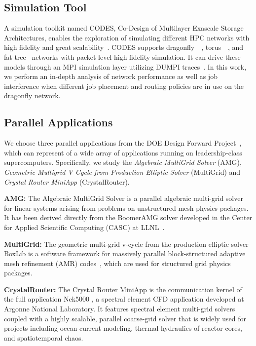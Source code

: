 \documentclass[conference,compsoc]{IEEEtran}
\begin{document}
\subsection{Simulation Tool}
\label{sec:simulation-tool}

A simulation toolkit named CODES, Co-Design of Multilayer Exascale Storage Architectures, enables the exploration of simulating different HPC networks with high fidelity and great scalability~\cite{codes}. CODES supports dragonfly~\cite{codes-dragonfly}~\cite{misbah-tpds}, torus~\cite{misbah-pads-2014}~\cite{ning-pads-2011}, and fat-tree~\cite{ning-pads-2015} networks with packet-level high-fidelity simulation. It can drive these models through an MPI simulation layer utilizing DUMPI traces~\cite{sst}. In this work, we perform an in-depth analysis of network performance as well as job interference when different job placement and routing policies are in use on the dragonfly network.

\subsection{Parallel Applications}
\label{sec: application traces}

We choose three parallel applications from the DOE Design Forward Project~\cite{designforwardwebpage}, which can represent of a wide array of applications running on leadership-class supercomputers. Specifically, we study the \emph{Algebraic MultiGrid Solver} (AMG), \emph{Geometric Multigrid V-Cycle from Production Elliptic Solver} (MultiGrid) and \emph{Crystal Router MiniApp} (CrystalRouter). 

\textbf{AMG:} The Algebraic MultiGrid Solver is a parallel algebraic multi-grid solver for linear systems arising from problems on unstructured mesh physics packages. It has been derived directly from the BoomerAMG solver developed in the Center for Applied Scientific Computing (CASC) at LLNL~\cite{amg}. 


\textbf{MultiGrid:} The geometric multi-grid v-cycle from the production elliptic solver BoxLib is a software framework for massively parallel block-structured adaptive mesh refinement (AMR) codes~\cite{boxlib}, which are used for structured grid physics packages. 

\textbf{CrystalRouter:} The Crystal Router MiniApp is the communication kernel of the full application Nek5000 \cite{nek5000}, a spectral element CFD application developed at Argonne National Laboratory. It features spectral element multi-grid solvers coupled with a highly scalable, parallel coarse-grid solver that is widely used for projects including ocean current modeling, thermal hydraulics of reactor cores, and spatiotemporal chaos. 
\end{document}
